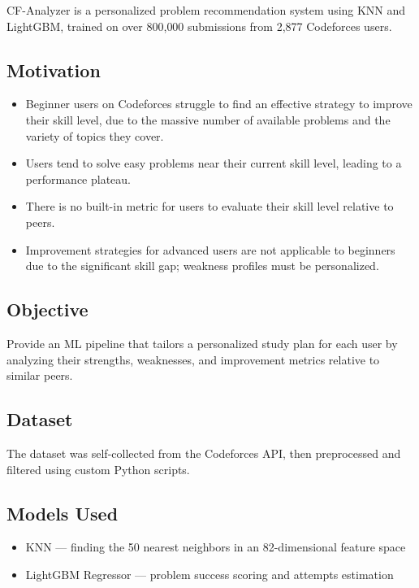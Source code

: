 \documentclass[12pt,a4paper]{article}
\begin{document}
CF-Analyzer is a personalized problem recommendation system using KNN and LightGBM,
trained on over 800{,}000 submissions from 2{,}877 Codeforces users.

\subsection*{Motivation}
\begin{itemize}
    \item Beginner users on Codeforces struggle to find an effective strategy to improve
          their skill level, due to the massive number of available problems and the
          variety of topics they cover.
    \item Users tend to solve easy problems near their current skill level, leading to
          a performance plateau.
    \item There is no built-in metric for users to evaluate their skill level relative
          to peers.
    \item Improvement strategies for advanced users are not applicable to beginners due
          to the significant skill gap; weakness profiles must be personalized.
\end{itemize}

\subsection*{Objective}
Provide an ML pipeline that tailors a personalized study plan for each user by
analyzing their strengths, weaknesses, and improvement metrics relative to similar
peers.

\subsection*{Dataset}
The dataset was self-collected from the Codeforces API, then preprocessed and filtered
using custom Python scripts.

\subsection*{Models Used}
    \begin{itemize}
        \item KNN --- finding the 50 nearest neighbors in an 82-dimensional feature space
        \item LightGBM Regressor --- problem success scoring and attempts estimation
    \end{itemize}
\end{document}
